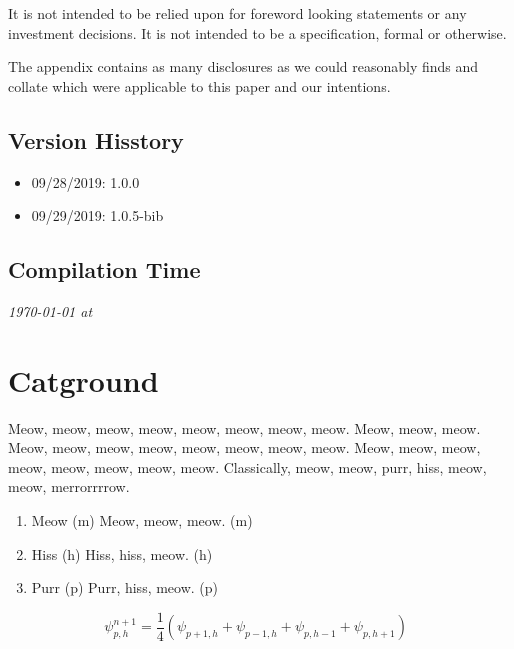 \documentclass[9pt,oneside]{amsart}
\newcommand*\lipsumeow{Meow, meow, meow, meow, meow, meow, meow, meow.  Meow, meow, meow. Meow, meow, meow, meow, meow, meow, meow, meow. Meow, meow, meow, meow, meow, meow, meow, meow. }
\begin{document}
\begin{multicols}{2}
 It is not intended to be relied upon for foreword looking statements or any investment decisions. It is not intended to be a specification, formal or otherwise. 

 The appendix contains as many disclosures as we could reasonably finds and collate which were applicable to this paper and our intentions.


\subsection{Version Hisstory}\label{subsec:history}

\begin{itemize}
 \item 09/28/2019: 1.0.0
 \item 09/29/2019: 1.0.5-bib
\end{itemize}

\subsection{Compilation Time}\label{subsec:compilation}

 \textit{{\ddmmyyyydate\today} at \currenttime}


\section{Catground}\label{sec:background}
 \lipsumeow{} 
 Classically, meow, meow, purr, hiss, meow, meow, merrorrrrow.

\begin{enumerate}
 \item Meow (m) Meow, meow, meow. (m)
 \item Hiss (h) Hiss, hiss, meow. (h)
 \item Purr (p) Purr, hiss, meow. (p)
\end{enumerate}

\begin{equation}
\psi_{p,h}^{n+1}=\frac{1}{4}\left( \psi_{p+1,h}+\psi_{p-1,h}+\psi_{p,h-1}+\psi_{p,h+1}\right)\;\;
\label{subsec:mrwhiskers}
\end{equation}


\end{multicols}
\end{document}
